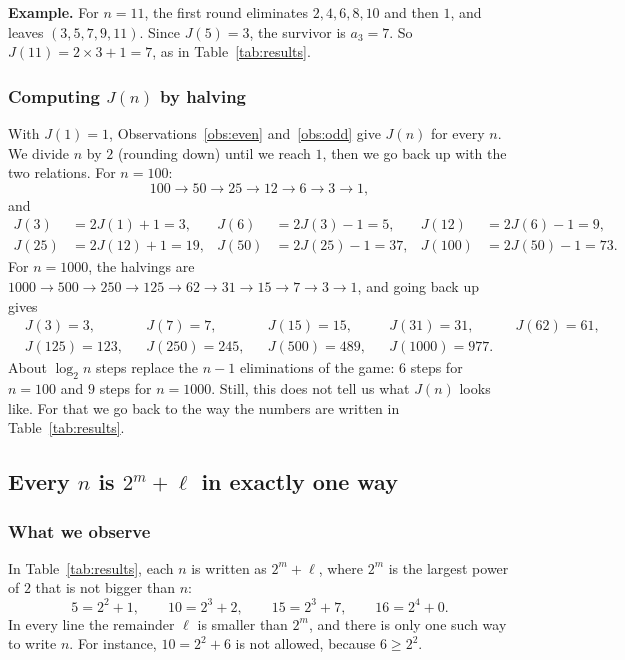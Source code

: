 \textbf{Example.} For $n=11$, the first round eliminates $2,4,6,8,10$ and then
$1$, and leaves $(3,5,7,9,11)$. Since $J(5)=3$, the survivor is $a_3=7$. So
$J(11)=2\times3+1=7$, as in Table~\ref{tab:results}.

\FloatBarrier
\subsubsection{Computing \texorpdfstring{$J(n)$}{J(n)} by halving}\label{sub:halving}

With $J(1)=1$, Observations~\ref{obs:even} and~\ref{obs:odd} give $J(n)$ for
every $n$. We divide $n$ by $2$ (rounding down) until we reach $1$, then we go
back up with the two relations. For $n=100$:
\[
100\to50\to25\to12\to6\to3\to1,
\]
and
\begin{align*}
J(3)&=2J(1)+1=3, & J(6)&=2J(3)-1=5, & J(12)&=2J(6)-1=9,\\
J(25)&=2J(12)+1=19, & J(50)&=2J(25)-1=37, & J(100)&=2J(50)-1=73.
\end{align*}
For $n=1000$, the halvings are
$1000\to500\to250\to125\to62\to31\to15\to7\to3\to1$, and going back up gives
\begin{align*}
&J(3)=3, && J(7)=7, && J(15)=15, && J(31)=31, && J(62)=61,\\
&J(125)=123, && J(250)=245, && J(500)=489, && J(1000)=977 .
\end{align*}
About $\log_2 n$ steps replace the $n-1$ eliminations of the game: $6$ steps
for $n=100$ and $9$ steps for $n=1000$. Still, this does not tell us what $J(n)$
looks like. For that we go back to the way the numbers are written in
Table~\ref{tab:results}.

\subsection{Every \texorpdfstring{$n$}{n} is \texorpdfstring{$2^m+\ell$}{2\^{}m+l} in exactly one way}

\subsubsection{What we observe}

In Table~\ref{tab:results}, each $n$ is written as $2^m+\ell$, where $2^m$ is
the largest power of $2$ that is not bigger than $n$:
\[
5=2^2+1,\qquad 10=2^3+2,\qquad 15=2^3+7,\qquad 16=2^4+0 .
\]
In every line the remainder $\ell$ is smaller than $2^m$, and there is only
one such way to write $n$. For instance, $10=2^2+6$ is not allowed, because
$6\geq2^2$.

